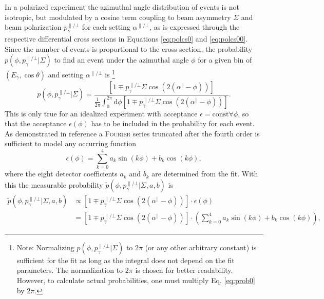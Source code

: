 In a polarized experiment the azimuthal angle distribution of events is not isotropic, but modulated by a cosine term coupling to beam asymmetry $\Sigma$ and beam polarization $p_\gamma^{\parallel/\bot}$ for each setting $\alpha^{\parallel/\bot}$, as is expressed through the respective differential cross sections in Equations \ref{eq:polcs0} and \ref{eq:polcs00}. Since the number of events is proportional to the cross section, the probability $p\left(\phi,p_\gamma^{\parallel/\bot}\big|\Sigma\right)$ to find an event under the azimuthal angle $\phi$ for a given bin of $\left(E_\gamma,\cos\theta\right)$ and setting $\alpha^{\parallel/\bot}$ is \footnote{Note: Normalizing $p\left(\phi,p_\gamma^{\parallel/\bot}\big|\Sigma\right)$ to $2\pi$ (or any other arbitrary constant) is sufficient for the fit as long as the integral does not depend on the fit parameters. The normalization to $2\pi$ is chosen for better readability. However, to calculate actual probabilities, one must multiply Eq. \eqref{eq:prob0} by $2\pi$.} \begin{equation}
	p\left(\phi,p_\gamma^{\parallel/\bot}\big|\Sigma\right)=\frac{\left[1\mp p_\gamma^{\parallel/\bot}\Sigma\cos\left(2\left(\alpha^\parallel-\phi\right)\right)\right]}{\frac{1}{2\pi}\int_{0}^{2\pi}\text{d}\phi\left[1\mp p_\gamma^{\parallel/\bot}\Sigma\cos\left(2\left(\alpha^\parallel-\phi\right)\right)\right] }.
	\label{eq:prob0}
\end{equation}
This is only true for an idealized experiment with acceptance $\epsilon=\text{const}\forall\phi$, so that the acceptance $\epsilon(\phi)$ has to be included in the probability for each event. As demonstrated in reference \cite{hartmannphd} a \textsc{Fourier} series truncated after the fourth order is sufficient to model any occurring function $$\epsilon\left(\phi\right)=\sum_{k=0}^4a_k\sin\left( k\phi\right)+b_k\cos\left(k\phi\right),$$ where the eight detector coefficients $a_k$ and $b_k$ are determined from the fit. With this the measurable probability $\tilde{p}\left(\phi,p_\gamma^{\parallel/\bot}\big|\Sigma,a,b\right)$ is 
\begin{align}
	\tilde{p}\left(\phi,p_\gamma^{\parallel/\bot}\big|\Sigma,a,b\right)&\propto\left[1\mp p_\gamma^{\parallel/\bot}\Sigma\cos\left(2\left(\alpha^\parallel-\phi\right)\right)\right]\cdot\epsilon(\phi)\\&=\left[1\mp p_\gamma^{\parallel/\bot}\Sigma\cos\left(2\left(\alpha^\parallel-\phi\right)\right)\right]\cdot\left(\sum_{k=0}^4a_k\sin\left( k\phi\right)+b_k\cos\left(k\phi\right)\right),
\end{align}

